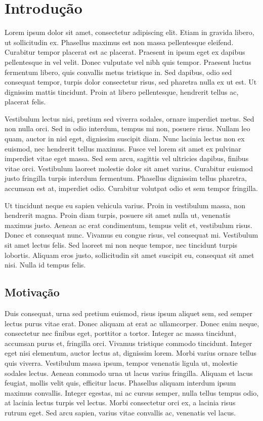 \chapter{Introdução}
\label{cap:introducao}

Lorem ipsum dolor sit amet, consectetur adipiscing elit. Etiam in gravida libero, ut sollicitudin ex. Phasellus maximus est non massa pellentesque eleifend. Curabitur tempor placerat est ac placerat. Praesent in ipsum eget ex dapibus pellentesque in vel velit. Donec vulputate vel nibh quis tempor. Praesent luctus fermentum libero, quis convallis metus tristique in. Sed dapibus, odio sed consequat tempor, turpis dolor consectetur risus, sed pharetra nulla ex ut est. Ut dignissim mattis tincidunt. Proin at libero pellentesque, hendrerit tellus ac, placerat felis.

Vestibulum lectus nisi, pretium sed viverra sodales, ornare imperdiet metus. Sed non nulla orci. Sed in odio interdum, tempus mi non, posuere risus. Nullam leo quam, auctor in nisl eget, dignissim suscipit diam. Nunc lacinia lectus non ex euismod, nec hendrerit tellus maximus. Fusce vel lorem sit amet ex pulvinar imperdiet vitae eget massa. Sed sem arcu, sagittis vel ultricies dapibus, finibus vitae orci. Vestibulum laoreet molestie dolor sit amet varius. Curabitur euismod justo fringilla turpis interdum fermentum. Phasellus dignissim tellus pharetra, accumsan est at, imperdiet odio. Curabitur volutpat odio et sem tempor fringilla.

Ut tincidunt neque eu sapien vehicula varius. Proin in vestibulum massa, non hendrerit magna. Proin diam turpis, posuere sit amet nulla ut, venenatis maximus justo. Aenean ac erat condimentum, tempus velit et, vestibulum risus. Donec et consequat nunc. Vivamus eu congue risus, vel consequat mi. Vestibulum sit amet lectus felis. Sed laoreet mi non neque tempor, nec tincidunt turpis lobortis. Aliquam eros justo, sollicitudin sit amet suscipit eu, consequat sit amet nisi. Nulla id tempus felis.

\section{Motivação}
\label{sec:motivacao}

Duis consequat, urna sed pretium euismod, risus ipsum aliquet sem, sed semper lectus purus vitae erat. Donec aliquam at erat ac ullamcorper. Donec enim neque, consectetur nec finibus eget, porttitor a tortor. Integer ac massa tincidunt, accumsan purus et, fringilla orci. Vivamus tristique commodo tincidunt. Integer eget nisi elementum, auctor lectus at, dignissim lorem. Morbi varius ornare tellus quis viverra. Vestibulum massa ipsum, tempor venenatis ligula ut, molestie sodales lectus. Aenean commodo urna ut lacus varius fringilla. Aliquam et lacus feugiat, mollis velit quis, efficitur lacus. Phasellus aliquam interdum ipsum maximus convallis. Integer egestas, mi ac cursus semper, nulla tellus tempus odio, at lacinia lectus turpis vel lectus. Morbi consectetur orci ex, a lacinia risus rutrum eget. Sed arcu sapien, varius vitae convallis ac, venenatis vel lacus.

